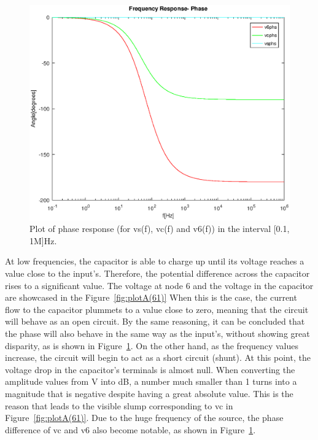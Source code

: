 \begin{figure}[h] \centering
\includegraphics[width=0.8\linewidth]{FrequencyResponsePhase.eps}
\caption{Plot of phase response (for vs(f), vc(f) and v6(f)) in the interval [0.1, 1M]Hz.}
\label{fig:plotA(62)}
\end{figure}

At low frequencies, the capacitor is able to charge up until its voltage reaches a value close to the input's. Therefore, the potential difference across the capacitor rises to a significant value. The voltage at node 6 and the voltage in the capacitor are showcased in the Figure~\ref{fig:plotA(61)} When this is the case, the current flow to the capacitor plummets to a value close to zero, meaning that the circuit will behave as an open circuit. By the same reasoning, it can be concluded that the phase will also behave in the same way as the input's, without showing great disparity, as is shown in Figure~\ref{fig:plotA(62)}. 
On the other hand, as the frequency values increase, the circuit will begin to act as a short circuit (shunt). At this point, the voltage drop in the capacitor's terminals is almost null. When converting the amplitude values from V into dB, a number much smaller than 1 turns into a magnitude that is negative despite having a great absolute value. This is the reason that leads to the visible slump corresponding to vc in Figure~\ref{fig:plotA(61)}. Due to the huge frequency of the source, the phase difference of vc and v6 also become notable, as shown in Figure~\ref{fig:plotA(62)}.

